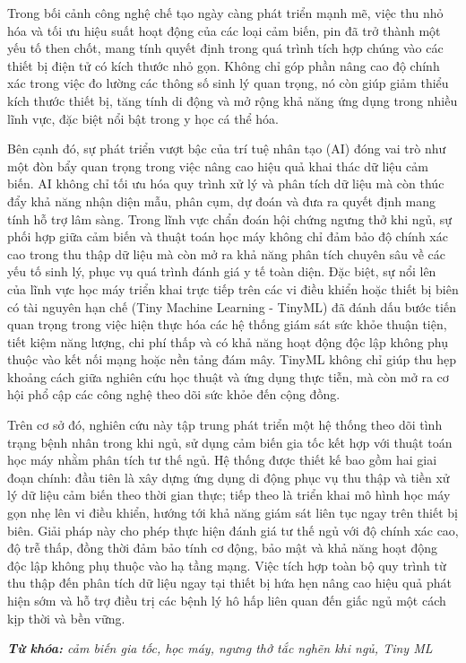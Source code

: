 Trong bối cảnh công nghệ chế tạo ngày càng phát triển mạnh mẽ, việc thu nhỏ hóa và tối ưu hiệu suất hoạt động của các loại cảm biến, pin đã trở thành một yếu tố then chốt, mang tính quyết định trong quá trình tích hợp chúng vào các thiết bị điện tử có kích thước nhỏ gọn. Không chỉ góp phần nâng cao độ chính xác trong việc đo lường các thông số sinh lý quan trọng, nó còn giúp giảm thiểu kích thước thiết bị, tăng tính di động và mở rộng khả năng ứng dụng trong nhiều lĩnh vực, đặc biệt nổi bật trong y học cá thể hóa.

Bên cạnh đó, sự phát triển vượt bậc của trí tuệ nhân tạo (AI) đóng vai trò như một đòn bẩy quan trọng trong việc nâng cao hiệu quả khai thác dữ liệu cảm biến. AI không chỉ tối ưu hóa quy trình xử lý và phân tích dữ liệu mà còn thúc đẩy khả năng nhận diện mẫu, phân cụm, dự đoán và đưa ra quyết định mang tính hỗ trợ lâm sàng. Trong lĩnh vực chẩn đoán hội chứng ngưng thở khi ngủ, sự phối hợp giữa cảm biến và thuật toán học máy không chỉ đảm bảo độ chính xác cao trong thu thập dữ liệu mà còn mở ra khả năng phân tích chuyên sâu về các yếu tố sinh lý, phục vụ quá trình đánh giá y tế toàn diện.
Đặc biệt, sự nổi lên của lĩnh vực học máy triển khai trực tiếp trên các vi điều khiển hoặc thiết bị biên có tài nguyên hạn chế (Tiny Machine Learning - TinyML) đã đánh dấu bước tiến quan trọng trong việc hiện thực hóa các hệ thống giám sát sức khỏe thuận tiện, tiết kiệm năng lượng, chi phí thấp và có khả năng hoạt động độc lập không phụ thuộc vào kết nối mạng hoặc nền tảng đám mây. TinyML không chỉ giúp thu hẹp khoảng cách giữa nghiên cứu học thuật và ứng dụng thực tiễn, mà còn mở ra cơ hội phổ cập các công nghệ theo dõi sức khỏe đến cộng đồng.


Trên cơ sở đó, nghiên cứu này tập trung phát triển một hệ thống theo dõi tình trạng bệnh nhân trong khi ngủ, 
sử dụng cảm biến gia tốc kết hợp với thuật toán học máy nhằm phân tích tư thế ngủ. 
Hệ thống được thiết kế bao gồm hai giai đoạn chính: 
đầu tiên là xây dựng ứng dụng di động phục vụ thu thập và tiền xử lý dữ liệu cảm biến theo thời gian thực; 
tiếp theo là triển khai mô hình học máy gọn nhẹ lên vi điều khiển, 
hướng tới khả năng giám sát liên tục ngay trên thiết bị biên. 
Giải pháp này cho phép thực hiện đánh giá tư thế ngủ với độ chính xác cao, độ trễ thấp,
đồng thời đảm bảo tính cơ động, bảo mật và khả năng hoạt động độc lập không phụ thuộc vào hạ tầng mạng. 
Việc tích hợp toàn bộ quy trình từ thu thập đến phân tích dữ liệu ngay tại thiết bị hứa hẹn nâng cao hiệu quả phát hiện sớm và 
hỗ trợ điều trị các bệnh lý hô hấp liên quan đến giấc ngủ một cách kịp thời và bền vững.



\vspace{-0.5cm}
\begin{flushleft}
  \textit{\textbf{Từ khóa: } cảm biến gia tốc, học máy, ngưng thở tắc nghẽn khi ngủ,  Tiny ML}
\end{flushleft}



\changefontsizes[16pt]{13pt}
